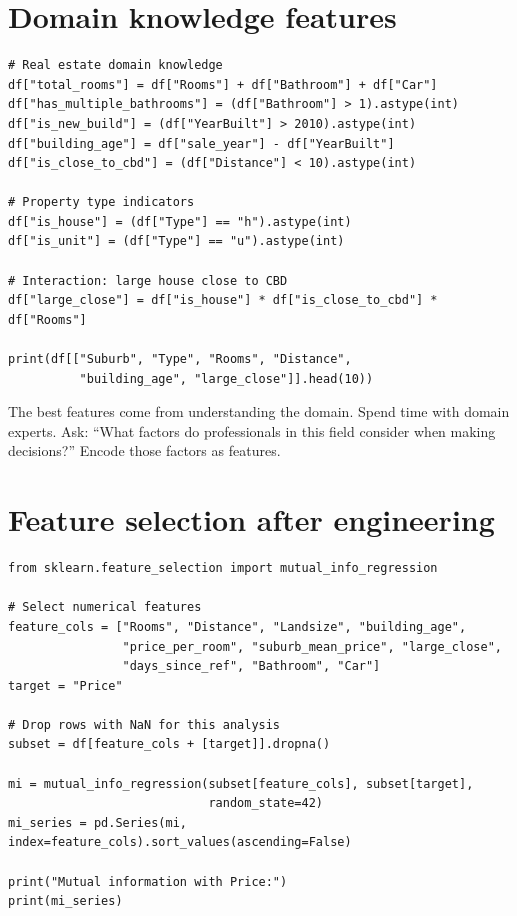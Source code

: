 \section{Domain knowledge features}

\begin{verbatim}
# Real estate domain knowledge
df["total_rooms"] = df["Rooms"] + df["Bathroom"] + df["Car"]
df["has_multiple_bathrooms"] = (df["Bathroom"] > 1).astype(int)
df["is_new_build"] = (df["YearBuilt"] > 2010).astype(int)
df["building_age"] = df["sale_year"] - df["YearBuilt"]
df["is_close_to_cbd"] = (df["Distance"] < 10).astype(int)

# Property type indicators
df["is_house"] = (df["Type"] == "h").astype(int)
df["is_unit"] = (df["Type"] == "u").astype(int)

# Interaction: large house close to CBD
df["large_close"] = df["is_house"] * df["is_close_to_cbd"] * df["Rooms"]

print(df[["Suburb", "Type", "Rooms", "Distance",
          "building_age", "large_close"]].head(10))
\end{verbatim}

\begin{datatip}
The best features come from understanding the domain. Spend time with domain experts. Ask: ``What factors do professionals in this field consider when making decisions?'' Encode those factors as features.
\end{datatip}

\section{Feature selection after engineering}

\begin{verbatim}
from sklearn.feature_selection import mutual_info_regression

# Select numerical features
feature_cols = ["Rooms", "Distance", "Landsize", "building_age",
                "price_per_room", "suburb_mean_price", "large_close",
                "days_since_ref", "Bathroom", "Car"]
target = "Price"

# Drop rows with NaN for this analysis
subset = df[feature_cols + [target]].dropna()

mi = mutual_info_regression(subset[feature_cols], subset[target],
                            random_state=42)
mi_series = pd.Series(mi, index=feature_cols).sort_values(ascending=False)

print("Mutual information with Price:")
print(mi_series)
\end{verbatim}

